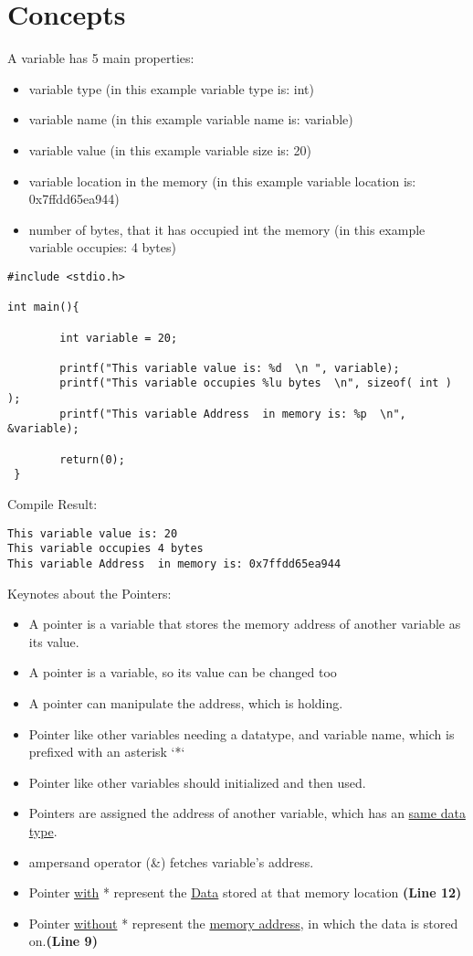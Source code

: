 \section{Concepts}
A variable has 5 main properties:
\begin{itemize}
    \item variable type (in this example variable type is: int)
    \item variable name (in this example variable name is: variable)
    \item variable value (in this example variable size is: 20)
    \item variable location in the memory (in this example variable location is: 0x7ffdd65ea944)
    \item number of bytes, that it has occupied int the memory (in this example variable occupies: 4 bytes)
\end{itemize}

\begin{lstlisting} 
#include <stdio.h>

int main(){
        
        int variable = 20;

        printf("This variable value is: %d  \n ", variable);
        printf("This variable occupies %lu bytes  \n", sizeof( int ) );
        printf("This variable Address  in memory is: %p  \n", &variable);
       
        return(0);
 }
\end{lstlisting}


Compile Result:
\begin{lstlisting} 
This variable value is: 20
This variable occupies 4 bytes
This variable Address  in memory is: 0x7ffdd65ea944
\end{lstlisting}

Keynotes about the Pointers:
\begin{itemize}
    \item A pointer is a variable that stores the memory address of another variable as its value.
    \item A pointer is a variable, so its value can be changed too
    \item A pointer can manipulate the address, which is holding.
    \item Pointer like other variables needing a datatype, and variable name, which is prefixed with an asterisk `*`
    \item Pointer like other variables should initialized and then used.
    \item Pointers are assigned the address of another variable, which has an \underline{same data type}.
    \item ampersand operator (\&) fetches variable's address.
    \item Pointer \underline{with} * represent the \underline{Data} stored at that memory location \textbf{(Line 12)}
    \item Pointer \underline{without} * represent the \underline{memory address}, in which the data is stored on.\textbf{(Line 9)}
\end{itemize}



